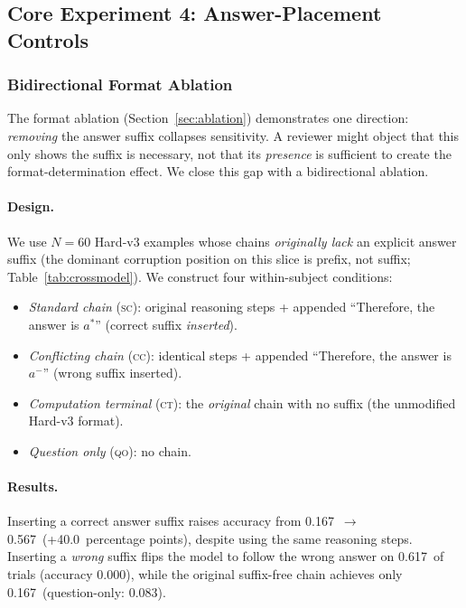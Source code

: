 \documentclass{article}
\theoremstyle{definition}
\theoremstyle{definition}
\newcommand{\BIDN}{60}
\newcommand{\BIDSCACC}{0.567}
\newcommand{\BIDCCACC}{0.000}
\newcommand{\BIDCCFW}{0.617}
\newcommand{\BIDQOACC}{0.083}
\newcommand{\BIDCTACC}{0.167}
\newcommand{\BIDDELTA}{+40.0}
\begin{document}
\subsection{Core Experiment 4: Answer-Placement Controls}
\label{sec:placement_controls}

\subsubsection{Bidirectional Format Ablation}
\label{sec:bidirectional}

The format ablation (Section~\ref{sec:ablation}) demonstrates one direction:
\emph{removing} the answer suffix collapses sensitivity. A reviewer might
object that this only shows the suffix is necessary, not that its
\emph{presence} is sufficient to create the format-determination effect.
We close this gap with a bidirectional ablation.

\paragraph{Design.}
We use $N{=}\BIDN$ Hard-v3 examples whose chains \emph{originally lack}
an explicit answer suffix (the dominant corruption position on this slice
is prefix, not suffix; Table~\ref{tab:crossmodel}).
We construct four within-subject conditions:
\begin{itemize}[nosep]
\item \emph{Standard chain} (\textsc{sc}): original reasoning steps
      + appended ``Therefore, the answer is $a^*$'' (correct suffix \emph{inserted}).
\item \emph{Conflicting chain} (\textsc{cc}): identical steps
      + appended ``Therefore, the answer is $a^-$'' (wrong suffix inserted).
\item \emph{Computation terminal} (\textsc{ct}): the \emph{original}
      chain with no suffix (the unmodified Hard-v3 format).
\item \emph{Question only} (\textsc{qo}): no chain.
\end{itemize}

\paragraph{Results.}
Inserting a correct answer suffix raises accuracy from
\BIDCTACC\ $\to$ \BIDSCACC\ (\BIDDELTA\ percentage points), despite
using the same reasoning steps.
Inserting a \emph{wrong} suffix flips the model to follow the wrong
answer on \BIDCCFW\ of trials (accuracy \BIDCCACC), while the original
suffix-free chain achieves only \BIDCTACC\ (question-only: \BIDQOACC).
\end{document}
